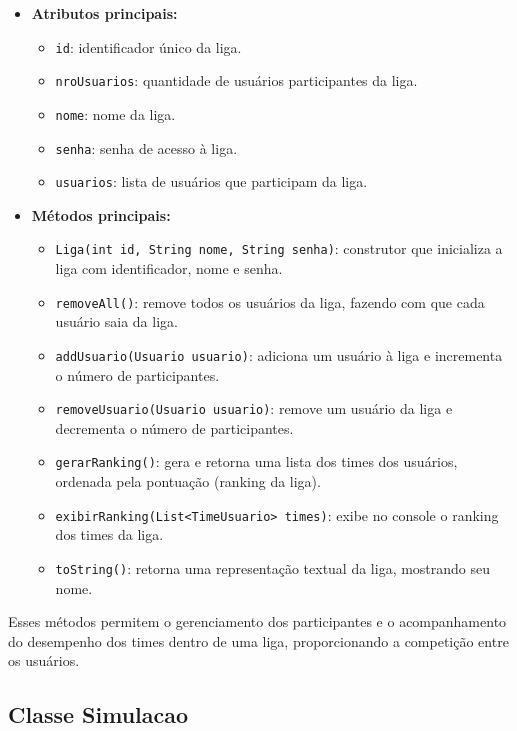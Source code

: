 \documentclass[12pt]{article}
\begin{document}
\begin{itemize}
  \item \textbf{Atributos principais:}
        \begin{itemize}
          \item \texttt{id}: identificador único da liga.
          \item \texttt{nroUsuarios}: quantidade de usuários participantes da liga.
          \item \texttt{nome}: nome da liga.
          \item \texttt{senha}: senha de acesso à liga.
          \item \texttt{usuarios}: lista de usuários que participam da liga.
        \end{itemize}
  \item \textbf{Métodos principais:}
        \begin{itemize}
          \item \texttt{Liga(int id, String nome, String senha)}: construtor que inicializa a liga com identificador, nome e senha.
          \item \texttt{removeAll()}: remove todos os usuários da liga, fazendo com que cada usuário saia da liga.
          \item \texttt{addUsuario(Usuario usuario)}: adiciona um usuário à liga e incrementa o número de participantes.
          \item \texttt{removeUsuario(Usuario usuario)}: remove um usuário da liga e decrementa o número de participantes.
          \item \texttt{gerarRanking()}: gera e retorna uma lista dos times dos usuários, ordenada pela pontuação (ranking da liga).
          \item \texttt{exibirRanking(List<TimeUsuario> times)}: exibe no console o ranking dos times da liga.
          \item \texttt{toString()}: retorna uma representação textual da liga, mostrando seu nome.
        \end{itemize}
\end{itemize}

Esses métodos permitem o gerenciamento dos participantes e o acompanhamento do desempenho dos times dentro de uma liga, proporcionando a competição entre os usuários.

\subsection{Classe Simulacao}
\end{document}
